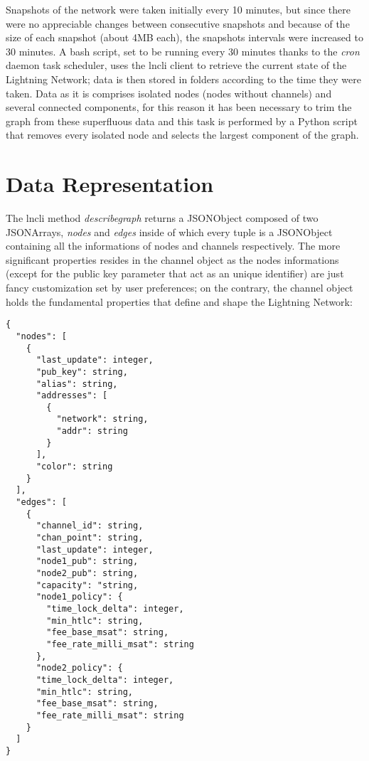 	Snapshots of the network were taken initially every 10 minutes, but since there were no appreciable changes between consecutive snapshots and because of the size of each snapshot (about 4MB each), the snapshots intervals were increased to 30 minutes. A bash script, set to be running every 30 minutes thanks to the \textit{cron} daemon task scheduler, uses the lncli client to retrieve the current state of the Lightning Network; data is then stored in folders according to the time they were taken. 
	Data as it is comprises isolated nodes (nodes without channels) and several connected components, for this reason it has been necessary to trim the graph from these superfluous data and this task is performed by a Python script that removes every isolated node and selects the largest component of the graph.
	
	\section{Data Representation}
	
	The lncli method \textit{describegraph} returns a JSONObject composed of two JSONArrays, \textit{nodes} and \textit{edges} inside of which every tuple is a JSONObject containing all the informations of nodes and channels respectively. The more significant properties resides in the channel object as the nodes informations (except for the public key parameter that act as an unique identifier) are just fancy customization set by user preferences; on the contrary, the channel object holds the fundamental properties that define and shape  the Lightning Network:


	
	\singlespacing
	
	\begin{lstlisting}[style=toplisting]
{
  "nodes": [
    {
      "last_update": integer,
      "pub_key": string,
      "alias": string,
      "addresses": [
        {
          "network": string,
          "addr": string
        }
      ],
      "color": string
    }
  ],
  "edges": [
    {
      "channel_id": string,
      "chan_point": string,
      "last_update": integer,
      "node1_pub": string,
      "node2_pub": string,
      "capacity": "string,
      "node1_policy": {
        "time_lock_delta": integer,
        "min_htlc": string,
        "fee_base_msat": string,
        "fee_rate_milli_msat": string
      },
      "node2_policy": {
      "time_lock_delta": integer,
      "min_htlc": string,
      "fee_base_msat": string,
      "fee_rate_milli_msat": string
    }
  ]
}
	\end{lstlisting}
	\onehalfspacing

